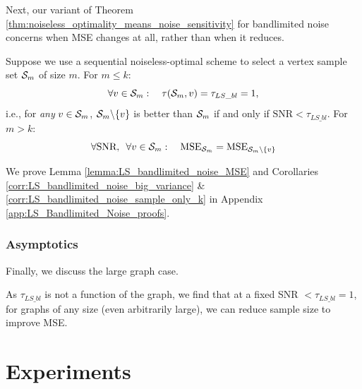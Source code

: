 \subsubsection{}
Next, our variant of Theorem \ref{thm:noiseless_optimality_means_noise_sensitivity} for bandlimited noise concerns when MSE changes at all, rather than when it reduces.
\begin{corollary}
\label{corr:LS_bandlimited_noise_sample_only_k}
    Suppose we use a sequential noiseless-optimal scheme to select a vertex sample set $\mathcal{S}_{m}$ of size $m$. For $m \leq k$: 
\begin{equation}
    \forall v \in \mathcal{S}_{m}: \quad \tau(\mathcal{S}_{m},v) = \tau_{LS\_bl} = 1,
\end{equation}
i.e., for \emph{any} $v \in \mathcal{S}_{m}$, $\mathcal{S}_{m} \backslash \{v\}$ is better than $\mathcal{S}_{m}$ if and only if $\textrm{SNR} < \tau_{LS\_bl}$.
For $m > k$: 
    \begin{equation}
        \forall \text{SNR}, \enskip \forall v \in \mathcal{S}_{m}: \quad \textrm{MSE}_{\mathcal{S}_{m}} = \textrm{MSE}_{\mathcal{S}_{m} \backslash \{ v \}}
    \end{equation}
\end{corollary}

\noindent We prove Lemma \ref{lemma:LS_bandlimited_noise_MSE} and Corollaries \ref{corr:LS_bandlimited_noise_big_variance} \& \ref{corr:LS_bandlimited_noise_sample_only_k} in Appendix \ref{app:LS_Bandlimited_Noise_proofs}.

{\color{black}
\subsubsection{Asymptotics}
Finally, we discuss the large graph case.
\begin{remark}
\label{rmk:LS_big_N_bl}
    As $\tau_{LS\_bl}$ is not a function of the graph, we find that at a fixed SNR $< \tau_{LS\_bl} = 1$, for graphs of any size (even arbitrarily large), we can reduce sample size to improve MSE.
\end{remark}
}


\section{Experiments}
\label{sec:experiments}
\label{experiments_sec}



